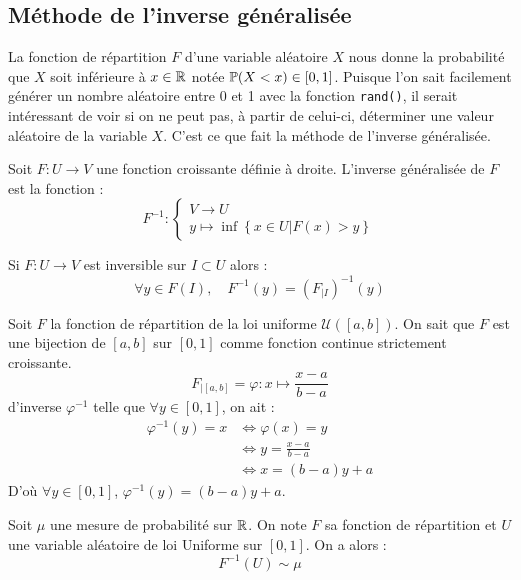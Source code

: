 \subsection{Méthode de l'inverse généralisée}

La fonction de répartition $F$ d'une variable aléatoire $X$ nous donne la probabilité 
que $X$ soit inférieure à $x \in \mathbb{R}$ notée $ \mathbb{P}(X < x) \in [0,1]$. 
Puisque l'on sait facilement générer un nombre aléatoire entre 0 et 1 avec la fonction \texttt{rand()}, 
il serait intéressant de voir si on ne peut pas, à partir de celui-ci, déterminer une 
valeur aléatoire de la variable $X$. C'est ce que fait la méthode de l'inverse généralisée. 

\begin{definition}
    Soit $F : U \longrightarrow V $ une fonction croissante définie à droite. L'inverse généralisée 
    de $F$ est la fonction : 
        $$ F^{-1} : 
            \begin{cases}
                V \longrightarrow U \\ 
                y \longmapsto \inf \left\{x \in U | F(x) > y\right\} 
            \end{cases}
        $$ 
\end{definition}

\begin{proposition}
    Si $F : U \longrightarrow V$ est inversible sur $I \subset U$ alors : 
        $$ \forall y \in F(I), \quad F^{-1}(y) = (F_{|I})^{-1}(y) $$ 
\end{proposition}

\begin{example}
    Soit $F$ la fonction de répartition de la loi uniforme $ \mathcal{U}([a,b])$. On sait que 
    $F$ est une bijection de $[a,b]$ sur $[0,1]$ comme fonction continue strictement croissante.
        $$ F_{|[a,b]} = \varphi : x \longmapsto \frac{x-a}{b-a} $$ 
    d'inverse $ \varphi^{-1}$ telle que $ \forall y \in [0,1]$, on ait : 
        \begin{align*}
            \varphi^{-1}(y) = x &\iff \varphi(x) = y \\ 
            & \iff y = \frac{x-a}{b-a} \\ 
            & \iff x = (b-a)y + a 
        \end{align*}
    D'où $ \forall y \in [0,1]$, $ \varphi^{-1}(y) = (b-a)y + a$. 
\end{example}

\begin{theorem}
    Soit $ \mu$ une mesure de probabilité sur $\mathbb{R}$. On note $F$ sa fonction de répartition et $U$ une variable 
    aléatoire de loi Uniforme sur $[0,1]$. On a alors : 
        $$ F^{-1}(U) \sim \mu $$ 
\end{theorem}

